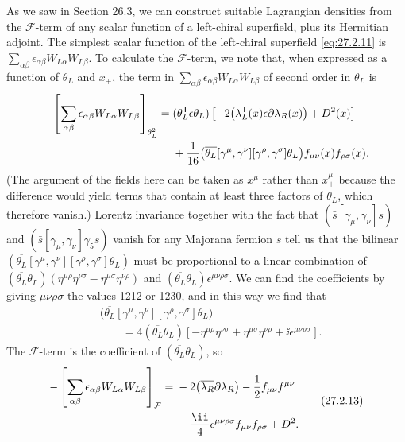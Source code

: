 As we saw in Section 26.3, we can construct suitable Lagrangian densities
from the \(\mathcal{F}\)-term of any scalar function of a left-chiral
superfield, plus its Hermitian adjoint. The simplest scalar function of the
left-chiral superfield \eqref{eq:27.2.11} is
\(\sum_{\alpha\beta}\epsilon_{\alpha\beta}W_{L\alpha}W_{L\beta}\).
To calculate the \(\mathcal{F}\)-term, we note that, when expressed as a
function of \(\theta_L\) and \(x_+\), the term in
\(\sum_{\alpha\beta}\epsilon_{\alpha\beta}W_{L\alpha}W_{L\beta}\) of
second order in \(\theta_L\) is
\[
  \begin{aligned}
  -\left[
    \sum_{\alpha\beta}\epsilon_{\alpha\beta}
      W_{L\alpha}W_{L\beta}
  \right]_{\theta_L^2}
  ={}&(\theta_L^{\mathsf T}\epsilon\theta_L)
    \left[
      -2\bigl(\lambda_L^{\mathsf T}(x)\epsilon
        \sl{\partial}\lambda_R(x)\bigr)+D^2(x)
    \right]
  \\
  &+\frac1{16}
    \bigl(\overline{\theta_L}[\gamma^\mu,\gamma^\nu]
      [\gamma^\rho,\gamma^\sigma]\theta_L\bigr)
    f_{\mu\nu}(x)f_{\rho\sigma}(x).
  \end{aligned}
\]
(The argument of the fields here can be taken as \(x^\mu\) rather than
\(x_+^\mu\) because the difference would yield terms that contain at least
three factors of \(\theta_L\), which therefore vanish.) Lorentz invariance
together with the fact that
\((\bar{s}[\gamma_\mu,\gamma_\nu]s)\) and
\((\bar{s}[\gamma_\mu,\gamma_\nu]\gamma_5s)\) vanish for any Majorana
fermion \(s\) tell us that the bilinear
\((\overline{\theta_L}[\gamma^\mu,\gamma^\nu]
[\gamma^\rho,\gamma^\sigma]\theta_L)\) must be proportional to a linear
combination of
\((\overline{\theta_L}\theta_L)
(\eta^{\mu\rho}\eta^{\nu\sigma}-\eta^{\mu\sigma}\eta^{\nu\rho})\)
and \((\overline{\theta_L}\theta_L)\epsilon^{\mu\nu\rho\sigma}\).
We can find the coefficients by giving \(\mu\nu\rho\sigma\) the values
1212 or 1230, and in this way we find that
\[
  \begin{aligned}
  &\bigl(\overline{\theta_L}[\gamma^\mu,\gamma^\nu]
    [\gamma^\rho,\gamma^\sigma]\theta_L\bigr)
  \\
  &\qquad
  =4(\overline{\theta_L}\theta_L)
    \left[
      -\eta^{\mu\rho}\eta^{\nu\sigma}
      +\eta^{\mu\sigma}\eta^{\nu\rho}
      +\ii\epsilon^{\mu\nu\rho\sigma}
    \right].
  \end{aligned}
\]
The \(\mathcal{F}\)-term is the coefficient of
\((\overline{\theta_L}\theta_L)\), so
\begin{equation}
  \begin{aligned}
  -\left[
    \sum_{\alpha\beta}\epsilon_{\alpha\beta}
      W_{L\alpha}W_{L\beta}
  \right]_{\mathcal{F}}
  ={}&-2\bigl(\overline{\lambda_R}\sl{\partial}\lambda_R\bigr)
    -\frac12f_{\mu\nu}f^{\mu\nu}
  \\
  &+\frac{\ii}{4}\epsilon^{\mu\nu\rho\sigma}
    f_{\mu\nu}f_{\rho\sigma}+D^2.
  \end{aligned}
  \tag{27.2.13}\label{eq:27.2.13}
\end{equation}
